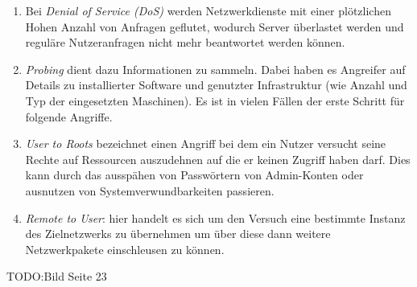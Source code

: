 \begin{enumerate}
\item Bei \textit{Denial of Service (DoS)} werden Netzwerkdienste mit einer plötzlichen Hohen Anzahl von Anfragen geflutet, wodurch Server überlastet werden und reguläre Nutzeranfragen nicht mehr beantwortet werden können.
\item \textit{Probing} dient dazu Informationen zu sammeln. Dabei haben es Angreifer auf Details zu installierter Software und genutzter Infrastruktur (wie Anzahl und Typ der eingesetzten Maschinen). Es ist in vielen Fällen der erste Schritt für folgende Angriffe.
\item \textit{User to Roots} bezeichnet einen Angriff bei dem ein Nutzer versucht seine Rechte auf Ressourcen auszudehnen auf die er keinen Zugriff haben darf. Dies kann durch das ausspähen von Passwörtern von Admin-Konten oder ausnutzen von Systemverwundbarkeiten passieren.
\item \textit{Remote to User}: hier handelt es sich um den Versuch eine bestimmte Instanz des Zielnetzwerks zu übernehmen um über diese dann weitere Netzwerkpakete einschleusen zu können.
\end{enumerate}
TODO:Bild Seite 23


